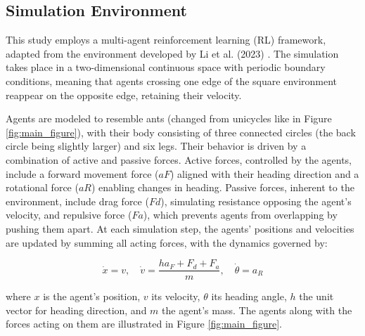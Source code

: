 \documentclass[9pt]{IEEEtran}
\begin{document}
\subsection{Simulation Environment}

This study employs a multi-agent reinforcement learning (RL) framework, adapted from the environment developed by Li et al. (2023) \cite{li2023predator}. The simulation takes place in a two-dimensional continuous space with periodic boundary conditions, meaning that agents crossing one edge of the square environment reappear on the opposite edge, retaining their velocity.

Agents are modeled to resemble ants (changed from unicycles like in Figure \ref{fig:main_figure}), with their body consisting of three connected circles (the back circle being slightly larger) and six legs. Their behavior is driven by a combination of active and passive forces. Active forces, controlled by the agents, include a forward movement force ($aF$) aligned with their heading direction and a rotational force ($aR$) enabling changes in heading. Passive forces, inherent to the environment, include drag force ($Fd$), simulating resistance opposing the agent's velocity, and repulsive force ($Fa$), which prevents agents from overlapping by pushing them apart. At each simulation step, the agents' positions and velocities are updated by summing all acting forces, with the dynamics governed by:

$$ \dot{x} = v, \quad \dot{v} = \frac{ha_F + F_d + F_a}{m}, \quad \dot{\theta} = a_R $$  

where $x$ is the agent's position, $v$ its velocity, $\theta$ its heading angle, $h$ the unit vector for heading direction, and $m$ the agent's mass. The agents along with the forces acting on them are illustrated in Figure \ref{fig:main_figure}.
\end{document}
